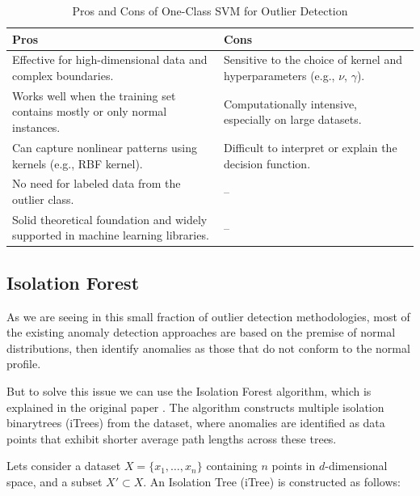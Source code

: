 \documentclass[11pt,english,a4paper,hidelinks]{book}
\begin{document}
\begin{table}[H]
    \centering
    \begin{tabular}{|p{7cm}|p{7cm}|}
        \hline
        \textbf{Pros} & \textbf{Cons} \\
            \hline
            Effective for high-dimensional data and complex boundaries. & Sensitive to the choice of kernel and hyperparameters (e.g., $\nu$, $\gamma$). \\
            \hline
            Works well when the training set contains mostly or only normal instances. & Computationally intensive, especially on large datasets. \\
            \hline
            Can capture nonlinear patterns using kernels (e.g., RBF kernel). & Difficult to interpret or explain the decision function. \\
            \hline
            No need for labeled data from the outlier class. & -- \\
            \hline
            Solid theoretical foundation and widely supported in machine learning libraries. & -- \\
        \hline
    \end{tabular}
    \caption{Pros and Cons of One-Class SVM for Outlier Detection}
\end{table}
    
    
\subsection{Isolation Forest}

As we are seeing in this small fraction of outlier detection methodologies, most of the existing anomaly detection approaches are based on the premise of normal distributions, then identify anomalies as those that do not conform to the normal profile.

\vspace{0.5cm}
\noindent But to solve this issue we can use the Isolation Forest algorithm, which is explained in the original paper \textcite{liu2012isolation}. The algorithm constructs multiple isolation binarytrees (iTrees) from the dataset, where anomalies are identified as data points that exhibit shorter average path lengths across these trees.

\vspace{0.5cm}
\noindent Lets consider a dataset $X = \{x_1, \dots, x_n\}$ containing $n$ points in $d$-dimensional space, and a subset $X' \subset X$. An Isolation Tree (iTree) is constructed as follows:
\end{document}
